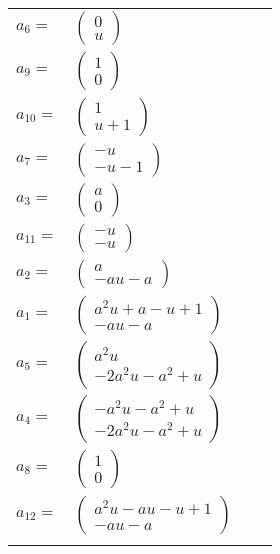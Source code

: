 \documentclass[1p]{elsarticle_modified}
\theoremstyle{definition}
\begin{document}
\begin{tabular}{m{7pt} m{180pt} m{7pt} m{180pt} }
\flushright $a_{6}=$&$\begin{pmatrix}0\\u\end{pmatrix}$ \\
\flushright $a_{9}=$&$\begin{pmatrix}1\\0\end{pmatrix}$ \\
\flushright $a_{10}=$&$\begin{pmatrix}1\\u+1\end{pmatrix}$ \\
\flushright $a_{7}=$&$\begin{pmatrix}- u\\- u-1\end{pmatrix}$ \\
\flushright $a_{3}=$&$\begin{pmatrix}a\\0\end{pmatrix}$ \\
\flushright $a_{11}=$&$\begin{pmatrix}- u\\- u\end{pmatrix}$ \\
\flushright $a_{2}=$&$\begin{pmatrix}a\\- a u- a\end{pmatrix}$ \\
\flushright $a_{1}=$&$\begin{pmatrix}a^2 u+a- u+1\\- a u- a\end{pmatrix}$ \\
\flushright $a_{5}=$&$\begin{pmatrix}a^2 u\\-2 a^2 u- a^2+u\end{pmatrix}$ \\
\flushright $a_{4}=$&$\begin{pmatrix}- a^2 u- a^2+u\\-2 a^2 u- a^2+u\end{pmatrix}$ \\
\flushright $a_{8}=$&$\begin{pmatrix}1\\0\end{pmatrix}$ \\
\flushright $a_{12}=$&$\begin{pmatrix}a^2 u- a u- u+1\\- a u- a\end{pmatrix}$\\&\end{tabular}
\end{document}
